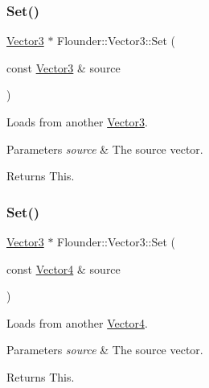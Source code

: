 \subsubsection{\texorpdfstring{Set()}{Set()}\hspace{0.1cm}{\footnotesize\ttfamily [2/4]}}
{\footnotesize\ttfamily \hyperlink{class_flounder_1_1_vector3}{Vector3} $\ast$ Flounder\+::\+Vector3\+::\+Set (\begin{DoxyParamCaption}\item[{const \hyperlink{class_flounder_1_1_vector3}{Vector3} \&}]{source }\end{DoxyParamCaption})}



Loads from another \hyperlink{class_flounder_1_1_vector3}{Vector3}. 


\begin{DoxyParams}{Parameters}
{\em source} & The source vector. \\
\hline
\end{DoxyParams}
\begin{DoxyReturn}{Returns}
This. 
\end{DoxyReturn}
\mbox{\label{class_flounder_1_1_vector3_a125216eaa159914258f5aadf9f986a47}} 
\subsubsection{\texorpdfstring{Set()}{Set()}\hspace{0.1cm}{\footnotesize\ttfamily [3/4]}}
{\footnotesize\ttfamily \hyperlink{class_flounder_1_1_vector3}{Vector3} $\ast$ Flounder\+::\+Vector3\+::\+Set (\begin{DoxyParamCaption}\item[{const \hyperlink{class_flounder_1_1_vector4}{Vector4} \&}]{source }\end{DoxyParamCaption})}



Loads from another \hyperlink{class_flounder_1_1_vector4}{Vector4}. 


\begin{DoxyParams}{Parameters}
{\em source} & The source vector. \\
\hline
\end{DoxyParams}
\begin{DoxyReturn}{Returns}
This. 
\end{DoxyReturn}
\mbox{\label{class_flounder_1_1_vector3_a79418f90ec1a3889a39c4a6f6077dfeb}} 
